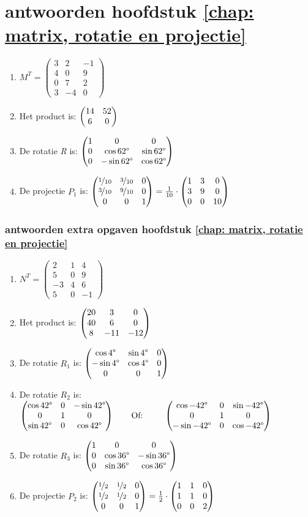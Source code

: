 \section{antwoorden  hoofdstuk \ref{chap: matrix, rotatie en projectie}}
\begin{enumerate}
	\item  
	$ M^{T} =	\begin{pmatrix}
	3 & 2 & -1\\
	4&0&9\\
	0&7&2\\
	3&-4&0 
	\end{pmatrix} $
	\item
	Het product is:  $ \begin{pmatrix} 14&52 \\ 6&0 \end{pmatrix}  $
	\item
	De rotatie \textit{R} is:  
	$ \begin{pmatrix} 1&0&0 \\ 0&\cos  62 \degree  & \sin 62 \degree \\ 0& -\sin 62 \degree & \cos 62 \degree \end{pmatrix}  $
	\item
	De projectie \textit{$P_1$} is:  
	$ \begin{pmatrix} \nicefrac{1}{10}&\nicefrac{3}{10}&0 \\ \nicefrac{3}{10}&\nicefrac{9}{10}  & 0 \\ 0& 0 & 1 \end{pmatrix}  
	= \frac{1}{10} \cdot\begin{pmatrix} 1&3&0 \\ 3&9  & 0 \\ 0& 0 & 10 \end{pmatrix} $    
	
\end{enumerate}

\subsubsection{antwoorden extra opgaven hoofdstuk \ref{chap: matrix, rotatie en projectie}}
\begin{enumerate}
	\item
	$ N^{T} =	\begin{pmatrix}
	2 & 1 & 4\\
	5&0&9\\
	-3&4&6\\
	5&0&-1 
	\end{pmatrix} $
	\item
	Het product is:  
	$ \begin{pmatrix} 20&3&0 \\ 40&6&0 \\ 8&-11&-12 \end{pmatrix} $
	\item    De rotatie   \textit{$ R_1  $}  is:  
	$ \begin{pmatrix} \cos  4 \degree  & \sin 4 \degree &0 \\  -\sin 4 \degree & \cos 4 \degree&0 \\ 0&0&1 \end{pmatrix} $
	\item De rotatie   \textit{$ R_2  $}  is:  
	$ \begin{pmatrix} \cos  42 \degree  & 0& -\sin 42 \degree  \\ 0&1&0 \\  \sin 42\degree &  0 &\cos 42 \degree \end{pmatrix} \qquad \text{Of: } \qquad
    \begin{pmatrix} \cos  -42 \degree  & 0& \sin -42 \degree  \\ 0&1&0 \\  -\sin -42\degree &  0 &\cos -42 \degree \end{pmatrix}
	$
	\item     De rotatie \textit{$ R_3  $} is:  
	$ \begin{pmatrix} 1&0&0 \\ 0&\cos  36 \degree  & -\sin 36 \degree \\ 0& \sin 36 \degree & \cos 36 \degree \end{pmatrix} $ \\
	\item   De projectie \textit{ $ P_2 $ } is:  
	$ \begin{pmatrix} \nicefrac{1}{2}&\nicefrac{1}{2}&0 \\ \nicefrac{1}{2}&\nicefrac{1}{2}  & 0 \\ 0& 0 & 1 \end{pmatrix}  
	= \frac{1}{2} \cdot\begin{pmatrix} 1&1&0 \\ 1& 1 & 0 \\ 0& 0 & 2 \end{pmatrix} $    
	
\end{enumerate}

